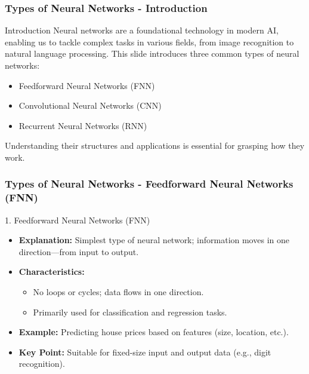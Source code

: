 \documentclass[aspectratio=169]{beamer}
\begin{document}
\begin{frame}[fragile]
    \frametitle{Types of Neural Networks - Introduction}
    \begin{block}{Introduction}
        Neural networks are a foundational technology in modern AI, enabling us to tackle complex tasks in various fields, from image recognition to natural language processing. This slide introduces three common types of neural networks:
        \begin{itemize}
            \item Feedforward Neural Networks (FNN)
            \item Convolutional Neural Networks (CNN)
            \item Recurrent Neural Networks (RNN)
        \end{itemize}
        Understanding their structures and applications is essential for grasping how they work.
    \end{block}
\end{frame}

\begin{frame}[fragile]
    \frametitle{Types of Neural Networks - Feedforward Neural Networks (FNN)}
    \begin{block}{1. Feedforward Neural Networks (FNN)}
        \begin{itemize}
            \item \textbf{Explanation:} Simplest type of neural network; information moves in one direction—from input to output.
            \item \textbf{Characteristics:}
                \begin{itemize}
                    \item No loops or cycles; data flows in one direction.
                    \item Primarily used for classification and regression tasks.
                \end{itemize}
            \item \textbf{Example:} Predicting house prices based on features (size, location, etc.).
            \item \textbf{Key Point:} Suitable for fixed-size input and output data (e.g., digit recognition).
        \end{itemize}
    \end{block}
\end{frame}
\end{document}
